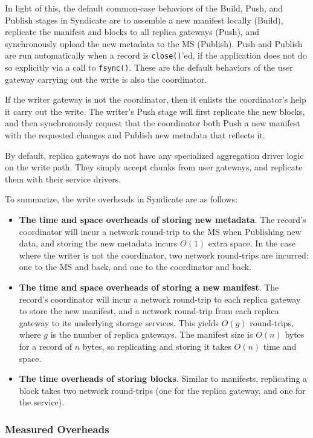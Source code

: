 In light of this, the default common-case behaviors of the Build, Push, and
Publish stages in Syndicate are to assemble a new manifest locally (Build),
replicate the manifest and blocks to all replica gateways (Push), and
synchronously upload the new metadata to the MS (Publish).  Push and Publish are
run automatically when a record is \texttt{close()}'ed, if the application does
not do so explicitly via a call to \texttt{fsync()}.  These are the default
behaviors of the user gateway carrying out the write is also the coordinator.

If the writer gateway is not the coordinator, then it enlists the
coordinator's help it carry out the write.  The writer's Push stage will first
replicate the new blocks, and then synchronously request that the coordinator
both Push a new manifest with the requested changes
and Publish new metadata that reflects it.

By default, replica gateways do not have any specialized aggregation driver
logic on the write path.
They simply accept chunks from user gateways, and replicate them with
their service drivers.

To summarize, the write overheads in Syndicate are as follows:

\begin{itemize}
\item \textbf{The time and space overheads of storing new metadata}.  The
record's coordinator will incur a network round-trip to the MS when Publishing
new data, and storing the new metadata incurs $O(1)$ extra space.  In the case
where the writer is not the coordinator, two network round-trips are incurred:
one to the MS and back, and one to the coordinator and back.
\item \textbf{The time and space overheads of storing a new manifest}.  The
record's coordinator will incur a network round-trip to each replica gateway to
store the new manifest, and a network round-trip from each replica gateway to
its underlying storage services.  This yields $O(g)$ round-trips, where $g$ is the number of
replica gateways.  The manifest size is $O(n)$ bytes for a record of $n$ bytes,
so replicating and storing it takes $O(n)$ time and space.
\item \textbf{The time overheads of storing blocks}.  Similar to manifests,
replicating a block takes two network round-trips (one for the replica gateway,
and one for the service).
\end{itemize}

\subsubsection{Measured Overheads}

